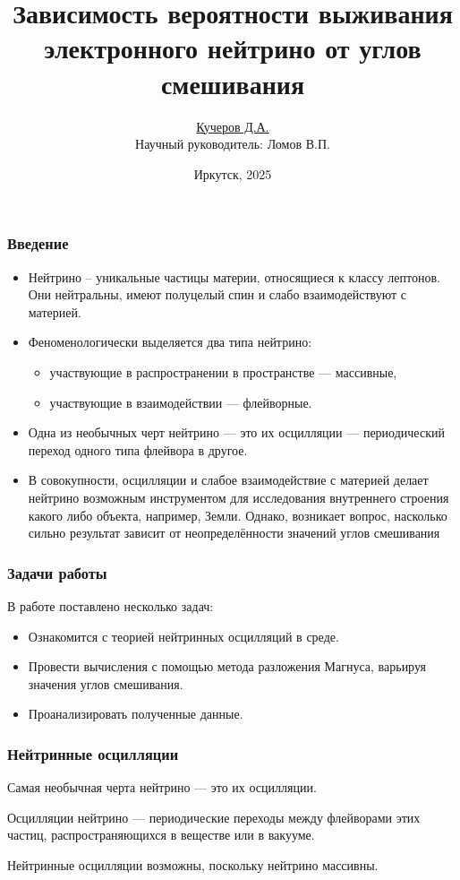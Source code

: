 \documentclass[utf8,9pt,mathserif,usepdftitle=false]{beamer}
\title{Зависимость вероятности выживания электронного нейтрино от углов
  смешивания}%
\author{\underline{Кучеров Д.А.}\\[7em]\raggedleft\footnotesize Научный руководитель:
  Ломов В.П.\\%
}%
\date[ИГУ, 2025]{\vfill%
  \small{}Иркутск, 2025}
\begin{document}
\begin{frame}
  \titlepage
\end{frame}

\begin{frame}
	\frametitle{Введение}
	\begin{itemize}
		\item<1-> Нейтрино -- уникальные частицы материи, относящиеся к классу лептонов. Они 
		нейтральны, имеют полуцелый спин и слабо взаимодействуют с материей. 
		\item<2-> Феноменологически выделяется два типа нейтрино: 
		\begin{itemize}
			\item<2-> участвующие в распространении в пространстве --- массивные, 
			\item<2-> участвующие в взаимодействии --- флейворные.
		\end{itemize}
		\item<3-> Одна из необычных черт нейтрино --- это их осцилляции --- периодический 
		переход одного типа флейвора в другое.
		\item<4-> В совокупности, осцилляции и слабое взаимодействие с материей делает 
		нейтрино 
		возможным инструментом для исследования внутреннего строения какого либо 
		объекта, например, Земли. Однако, возникает вопрос, насколько сильно результат 
		зависит от неопределённости значений углов смешивания  
	\end{itemize}
	
\end{frame}

\begin{frame}
	\frametitle{Задачи работы}
  В работе поставлено несколько задач:
  \begin{itemize}
  \item<2-> Ознакомится с теорией нейтринных осцилляций в среде.
  \item<3-> Провести вычисления с помощью метода разложения Магнуса, варьируя
    значения углов смешивания.
  \item<4-> Проанализировать полученные данные.
  \end{itemize}
\end{frame}

\begin{frame}
	\frametitle{Нейтринные осцилляции}%
	Самая необычная черта нейтрино — это их осцилляции.

  Осцилляции нейтрино — периодические переходы между флейворами этих частиц,
  распространяющихся в веществе или в вакууме.

  Нейтринные осцилляции возможны, поскольку нейтрино массивны.%
\end{frame}
\end{document}
